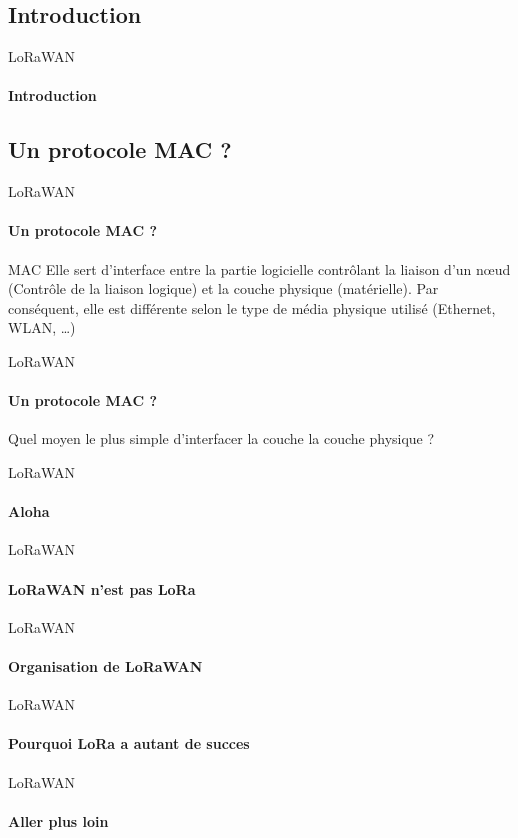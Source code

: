 \subsection{Introduction}

\begin{frame}{LoRaWAN}
\framesubtitle{Introduction}

\end{frame}

\subsection{Un protocole MAC ?}

\begin{frame}{LoRaWAN}
\framesubtitle{Un protocole MAC ?}

\begin{block}{MAC}
Elle sert d'interface entre la partie logicielle contrôlant la 
liaison d'un nœud (Contrôle de la liaison logique) et la couche 
physique (matérielle). Par conséquent, elle est différente selon 
le type de média physique utilisé (Ethernet, WLAN, …)
\end{block}

\end{frame}

\begin{frame}{LoRaWAN}
\framesubtitle{Un protocole MAC ?}
\begin{block}{}
{
  Quel moyen le plus simple d'interfacer la couche la couche physique ?
}
\end{block}
\end{frame}

\begin{frame}{LoRaWAN}
\framesubtitle{Aloha}
\end{frame}

\begin{frame}{LoRaWAN}
\framesubtitle{LoRaWAN n'est pas LoRa}
\end{frame}

\begin{frame}{LoRaWAN}
\framesubtitle{Organisation de LoRaWAN}
\end{frame}

\begin{frame}{LoRaWAN}
\framesubtitle{Pourquoi LoRa a autant de succes}
\end{frame}

\begin{frame}{LoRaWAN}
\framesubtitle{Aller plus loin}
\end{frame}
